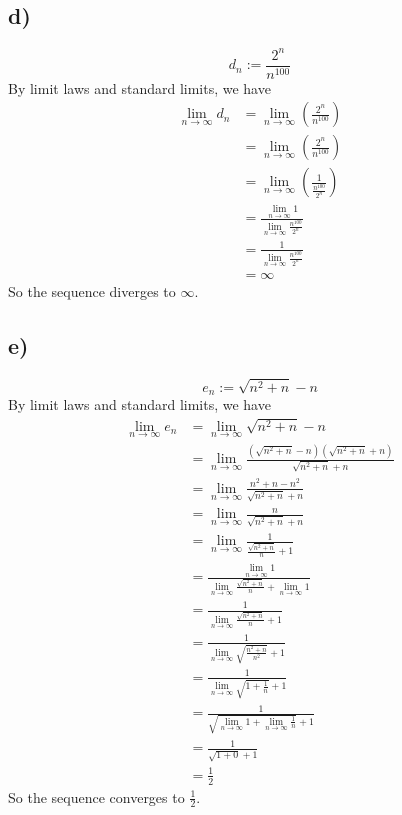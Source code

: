 \documentclass{article}
\newcommand{\limn}{\lim_{n\to\infty}}
\theoremstyle{mytheoremstyle}
\theoremstyle{mytheoremstyle}
\theoremstyle{myproblemstyle}
\begin{document}
    \subsection{d)}
    $$d_n := \frac{2^n}{n^{100}}$$
        By limit laws and standard limits, we have
        \begin{align*}
            \limn d_n &= \limn(\frac{2^n}{n^{100}}) \\
                      &= \limn\left(\frac{2^n}{n^{100}}\right) \\
                      &= \limn{\left(\frac{1}{\frac{n^{100}}{2^n}}\right)} \\
                      &= \frac{\limn 1}{\limn\frac{n^{100}}{2^n}} \\
                      &= \frac{1}{\limn\frac{n^{100}}{2^n}} \\
                      &= \infty
        \end{align*}
    So the sequence diverges to $\infty$.
    \subsection{e)}
    $$e_n := \sqrt{n^2+n}-n$$
        By limit laws and standard limits, we have
        \begin{align*}
            \limn{e_n} &= \limn{\sqrt{n^2+n} - n} \\
            &= \limn{\frac{(\sqrt{n^2+n} - n)(\sqrt{n^2+n} + n)}{\sqrt{n^2+n} + n}} \\
            &= \limn{\frac{n^2+n - n^2}{\sqrt{n^2+n} + n}} \\
            &= \limn{\frac{n}{\sqrt{n^2+n} + n}} \\
            &= \limn{\frac{1}{\frac{\sqrt{n^2+n}}{n} + 1}} \\
            &= \frac{\limn 1}{\limn\frac{\sqrt{n^2+n}}{n} + \limn 1} \\
            &= \frac{1}{\limn\frac{\sqrt{n^2+n}}{n} + 1} \\
            &= \frac{1}{\limn\sqrt{\frac{n^2+n}{n^2}} + 1} \\
            &= \frac{1}{\limn\sqrt{1 + \frac{1}{n}} + 1} \\
            &= \frac{1}{\sqrt{\limn 1 + \limn\frac{1}{n}} + 1} \\
            &= \frac{1}{\sqrt{1 + 0} + 1} \\
            &= \frac{1}{2}
        \end{align*}
    So the sequence converges to $\frac{1}{2}$.
\end{document}
